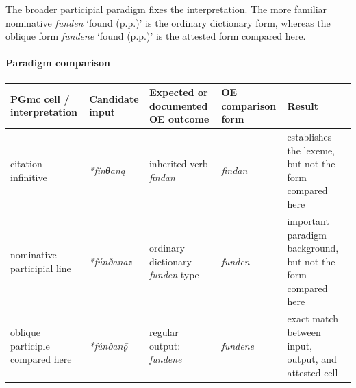 \documentclass[
  british,
  a4paper,
]{article}
\newcounter{none} %
\begin{document}
The broader participial paradigm fixes the interpretation. The more
familiar nominative {\emph{funden}} `found (p.p.)' is the ordinary
dictionary form, whereas the oblique form {\emph{fundene}} `found
(p.p.)' is the attested form compared here.

\paragraph{Paradigm comparison}\label{paradigm-comparison-4}

{\def\LTcaptype{none} %
\begin{longtable}[]{@{}
  >{\raggedright\arraybackslash}p{}
  >{\raggedright\arraybackslash}p{}
  >{\raggedright\arraybackslash}p{}
  >{\raggedright\arraybackslash}p{}
  >{\raggedright\arraybackslash}p{}@{}}
\toprule\noalign{}
\begin{minipage}[b]{\linewidth}\raggedright
PGmc cell / interpretation
\end{minipage} & \begin{minipage}[b]{\linewidth}\raggedright
Candidate input
\end{minipage} & \begin{minipage}[b]{\linewidth}\raggedright
Expected or documented OE outcome
\end{minipage} & \begin{minipage}[b]{\linewidth}\raggedright
OE comparison form
\end{minipage} & \begin{minipage}[b]{\linewidth}\raggedright
Result
\end{minipage} \\
\midrule\noalign{}
\endhead
\bottomrule\noalign{}
\endlastfoot
citation infinitive & {\emph{*fínθaną}} & inherited verb {\emph{findan}}
& {\emph{findan}} & establishes the lexeme, but not the form compared
here \\
nominative participial line & {\emph{*fúnðanaz}} & ordinary dictionary
{\emph{funden}} type & {\emph{funden}} & important paradigm background,
but not the form compared here \\
oblique participle compared here & {\emph{*fúnðanǭ}} & regular output:
{\emph{fundene}} & {\emph{fundene}} & exact match between input, output,
and attested cell \\
\end{longtable}
}
\end{document}
